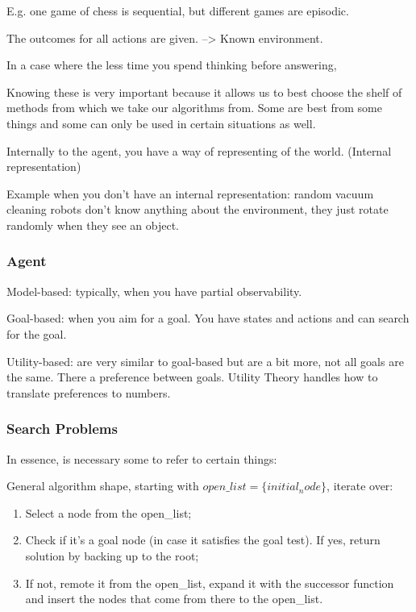 E.g. one game of chess is sequential, but different games are episodic.


The outcomes for all actions are given. --> Known environment.



In a case where the less time you spend thinking before answering, 


Knowing these is very important because it allows us to best choose the shelf of methods from which we take our algorithms from. Some are best from some things and some can only be used in certain situations as well.


Internally to the agent, you have a way of representing of the world. (Internal representation)

Example when you don't have an internal representation: random vacuum cleaning robots don't know anything about the environment, they just rotate randomly when they see an object.




\subsubsection{Agent}

Model-based: typically, when you have partial observability.

Goal-based: when you aim for a goal. You have states and actions and can search for the goal.

Utility-based: are very similar to goal-based but are a bit more, not all goals are the same. There a preference between goals. 
Utility Theory handles how to translate preferences to numbers. 







\subsubsection{Search Problems}

In essence, is necessary some  to refer to certain things:


General algorithm shape, starting with $open\_list = \{initial_node\}$, iterate over:
\begin{enumerate}
    \item Select a node from the open\_list;
    \item Check if it's a goal node (in case it satisfies the goal test). If yes, return solution by backing up to the root;
    \item If not, remote it from the open\_list, expand it with the successor function and insert the nodes that come from there to the open\_list.
\end{enumerate}

